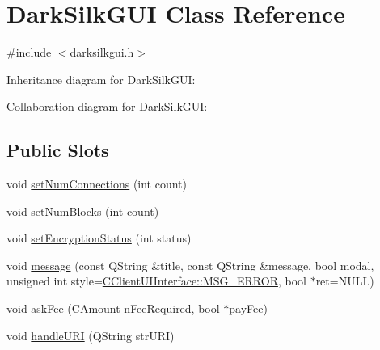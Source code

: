\hypertarget{class_dark_silk_g_u_i}{}\section{Dark\+Silk\+G\+U\+I Class Reference}
\label{class_dark_silk_g_u_i}


{\ttfamily \#include $<$darksilkgui.\+h$>$}



Inheritance diagram for Dark\+Silk\+G\+U\+I\+:


Collaboration diagram for Dark\+Silk\+G\+U\+I\+:
\subsection*{Public Slots}
\begin{DoxyCompactItemize}
\item 
void \hyperlink{class_dark_silk_g_u_i_a7e1e79546bee2c49830d7d11c9bee8bb}{set\+Num\+Connections} (int count)
\item 
void \hyperlink{class_dark_silk_g_u_i_a2a303132be32277f46691fe91803f766}{set\+Num\+Blocks} (int count)
\item 
void \hyperlink{class_dark_silk_g_u_i_a4be47e469eccc462eec6556b8b8ffb52}{set\+Encryption\+Status} (int status)
\item 
void \hyperlink{class_dark_silk_g_u_i_aa5509e7f1502f9b9bc3dd916a31c8d15}{message} (const Q\+String \&title, const Q\+String \&message, bool modal, unsigned int style=\hyperlink{class_c_client_u_i_interface_a568cf07ecac3fac224d63b42a32e8bc1a0551e67c07eb6a81edf6e43fed89759f}{C\+Client\+U\+I\+Interface\+::\+M\+S\+G\+\_\+\+E\+R\+R\+O\+R}, bool $\ast$ret=N\+U\+L\+L)
\item 
void \hyperlink{class_dark_silk_g_u_i_aff74bbf8244654f663188e4589d8e311}{ask\+Fee} (\hyperlink{amount_8h_a4eaf3a5239714d8c45b851527f7cb564}{C\+Amount} n\+Fee\+Required, bool $\ast$pay\+Fee)
\item 
void \hyperlink{class_dark_silk_g_u_i_abd255bcdc761c0ed6ea5e3eb285be1d0}{handle\+U\+R\+I} (Q\+String str\+U\+R\+I)
\end{DoxyCompactItemize}
